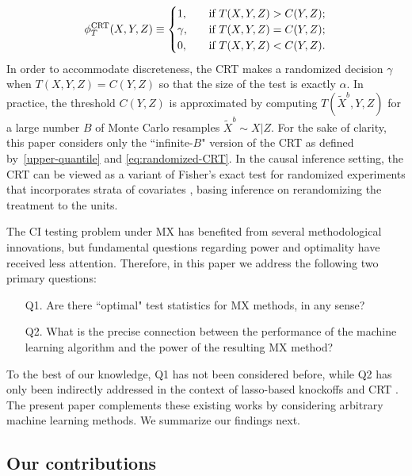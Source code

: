 \documentclass[ejs]{imsart}
\numberwithin{equation}{section}
\theoremstyle{plain}
\theoremstyle{definition}
\theoremstyle{remark}
\newcommand{\srx}{X}
\newcommand{\srz}{Z}
\newcommand{\srxk}{\widetilde X}
\newcommand{\sry}{Y}
\def\CRT{\textnormal{CRT}}
\begin{document}
\begin{equation}
	\label{eq:randomized-CRT}
	\phi^{\CRT}_T(\srx,\sry,\srz) \equiv 
	\begin{cases}
		1, \quad &\text{if }  T(\srx, \sry, \srz) > C(\sry,\srz); \\
		\gamma, \quad &\text{if }  T(\srx, \sry, \srz) = C(\sry,\srz); \\
		0, \quad &\text{if }T(\srx, \sry, \srz) < C(\sry,\srz).
	\end{cases}
\end{equation}
In order to accommodate discreteness, the CRT makes a randomized decision $\gamma$ when $T(\srx, \sry, \srz) = C(\sry,\srz)$ so that the size of the test is exactly $\alpha$. In practice, the threshold $C(\sry,\srz)$ is approximated by computing $T(\srxk^b, \sry, \srz)$ for a large number $B$ of Monte Carlo resamples $\srxk^b \sim \srx|\srz$. For the sake of clarity, this paper considers only the ``infinite-$B$" version of the CRT as defined by~\eqref{upper-quantile} and \eqref{eq:randomized-CRT}. In the causal inference setting, the CRT can be viewed as a variant of Fisher's exact test for randomized experiments that incorporates strata of covariates \cite{Zheng2008,Hennessy2016}, basing inference on rerandomizing the treatment to the units. 

The CI testing problem under MX has benefited from several methodological innovations, but fundamental questions regarding power and optimality have received less attention. Therefore, in this paper we address the following two primary questions:
\begin{enumerate}
	\item[Q1.] Are there ``optimal" test statistics for MX methods, in any sense?
	\item[Q2.] What is the precise connection between the performance of the machine learning algorithm and the power of the resulting MX method?
\end{enumerate}
To the best of our knowledge, Q1 has not been considered before, while Q2 has only been indirectly addressed in the context of lasso-based knockoffs \cite{Weinstein2017, Liu2019, Fan2020, Weinstein2020} and CRT \cite{Wang2020b, Celentano2020}. The present paper complements these existing works by considering arbitrary machine learning methods. We summarize our findings next.

\subsection{Our contributions}
\end{document}
